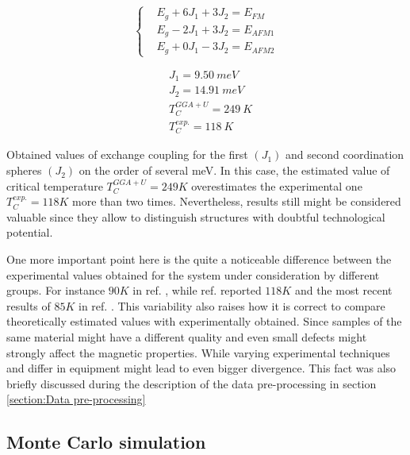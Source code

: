 \begin{multicols}{2}
\begin{equation}
  \left\{
    \begin{aligned}
      & E_g + 6J_1 + 3J_2 = E_{FM}\\
      & E_g - 2J_1 + 3J_2 = E_{AFM1}\\
      & E_g +0J_1 - 3J_2 =  E_{AFM2}
    \end{aligned}
  \right.
\end{equation}

\begin{equation}
    \begin{aligned}
      & J_{1} =9.50\ meV\\
      & J_{2} =14.91\ meV \\
      & T_C^{GGA+U} = 249\ K \\
      & T_C^{exp.} = 118\ K
    \end{aligned}
\end{equation}
\end{multicols}

Obtained values of exchange coupling for the first $(J_1)$ and second coordination spheres $(J_2)$ on the order of several meV. In this case, the estimated value of critical temperature $T^{GGA+U}_C = 249 K$ overestimates the experimental one $T^{exp.}_C = 118 K$ more than two times. Nevertheless, results still might be considered valuable since they allow to distinguish structures with doubtful technological potential.

One more important point here is the quite a noticeable difference between the experimental values obtained for the system under consideration by different groups. For instance $90 K$ in ref. \cite{Lines_1965}, while ref. \cite{Roth_1958} reported $118 K$ and the most recent results of $85 K$ in ref. \cite{Pepy_1974}. This variability also raises how it is correct to compare theoretically estimated values with experimentally obtained. Since samples of the same material might have a different quality and even small defects might strongly affect the magnetic properties. While varying experimental techniques and differ in equipment might lead to even bigger divergence. This fact was also briefly discussed during the description of the data pre-processing  in section \ref{section:Data pre-processing}

\subsection{Monte Carlo simulation} 

